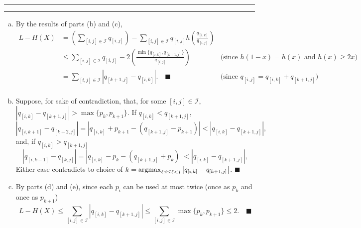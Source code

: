 \documentclass[11pt]{article}
\newcounter{questionCounter}
\newcounter{partCounter}[questionCounter]
\newenvironment{question}[2][\arabic{questionCounter}]{%
    \setcounter{partCounter}{0}%
    \vspace{.25in} \hrule \vspace{0.5em}%
        \noindent{\bf #2}%
    \vspace{0.8em} \hrule \vspace{.10in}%
    \addtocounter{questionCounter}{1}%
}{}
\renewcommand{\qed}{\quad $\blacksquare$}
\newcommand{\mqed}{\quad \blacksquare}
\newcommand{\argmax}{\operatornamewithlimits{argmax}}
\newcommand{\I}{\mathcal{I}}
\begin{document}
\begin{question}{Problem 5}
\begin{enumerate}[(a)]
\item By the results of parts (b) and (c),
\begin{align*}
L - H(X)
 & = \left( \sum_{[i,j] \in \I} q_{[i,j]} \right)
   - \sum_{[i,j] \in \I}
                    q_{[i,j]} h \left( \frac{q_{[i,k]}}{q_{[i,j]}} \right) \\
 & \leq \sum_{[i,j] \in \I} q_{[i,j]}
   - 2 \left( \frac{\min\{q_{[i,k]},q_{[k + 1,j]}\}}{q_{[i,j]}} \right)
 & \mbox{(since $h(1 - x) = h(x)$ and $h(x) \geq 2x$)} \\
 & = \sum_{[i,j] \in \I} \left| q_{[k + 1,j]} - q_{[i,k]} \right|. \mqed
 & \mbox{(since $q_{[i,j]} = q_{[i,k]} + q_{[k + 1, j]}$)} \\
\end{align*}

\item Suppose, for sake of contradiction, that, for some $[i,j] \in \I$,
$\left| q_{[i,k]} - q_{[k + 1,j]} \right| > \max\{p_k, p_{k + 1}\}$. If
$q_{[i,k]} < q_{[k + 1, j]}$,
\[\left| q_{[i,k + 1]} - q_{[k + 2,j]} \right|
 = \left| q_{[i,k]} + p_{k + 1} - (q_{[k + 1,j]} - p_{k + 1}) \right|
 < \left| q_{[i,k]} - q_{[k + 1,j]} \right|,
 \]
and, if $q_{[i,k]} > q_{[k + 1, j]}$
\[\left| q_{[i,k - 1]} - q_{[k,j]} \right|
 = \left| q_{[i, k]} - p_k - (q_{[k + 1,j]} + p_k) \right|
 < \left| q_{[i,k]} - q_{[k + 1,j]} \right|,
 \]
Either case contradicts to choice of
$k = \argmax_{\ell : i \leq \ell < j}\left| q_{[i,k]} - q_{[k + 1,j]} \right|$.
\qed

\item By parts (d) and (e), since each $p_i$ can be used at most
twice (once as $p_k$ and once as $p_{k + 1}$)
\[L - H(X)
  \leq \sum_{[i,j] \in \I} \left| q_{[i,k]} - q_{[k + 1, j]} \right|
  \leq \sum_{[i,j] \in \I} \max\{p_k, p_{k + 1}\}
  \leq 2. \mqed
\]

\end{enumerate}
\end{question}
\end{document}
